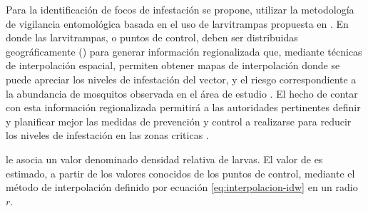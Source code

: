 

Para la identificación de focos de infestación se propone, utilizar la metodología de vigilancia
entomológica basada en el uso de larvitrampas propuesta en \cite{NINO2011}. En donde las
larvitrampas, o puntos de control, deben ser distribuidas geográficamente () para generar información
regionalizada que, mediante técnicas de interpolación espacial, permiten obtener mapas de
interpolación donde se puede apreciar los niveles de infestación del vector, y el riesgo
correspondiente a la abundancia de mosquitos observada en el área de estudio
\cite{NINO2011, nino2008uso, journal.pone.0054167, albierispatial}. El hecho de contar con esta
información regionalizada permitirá a las autoridades pertinentes definir y planificar mejor las
medidas de prevención y control a realizarse para reducir los niveles de infestación en las zonas
criticas \cite{NINO2011, nino2008uso, petric2012surveillance}.


le asocia un valor denominado densidad relativa de larvas. El valor de  es estimado, a partir de los valores conocidos de los puntos de
control, mediante el método de interpolación definido por ecuación \eqref{eq:interpolacion-idw} en
un radio $r$.
